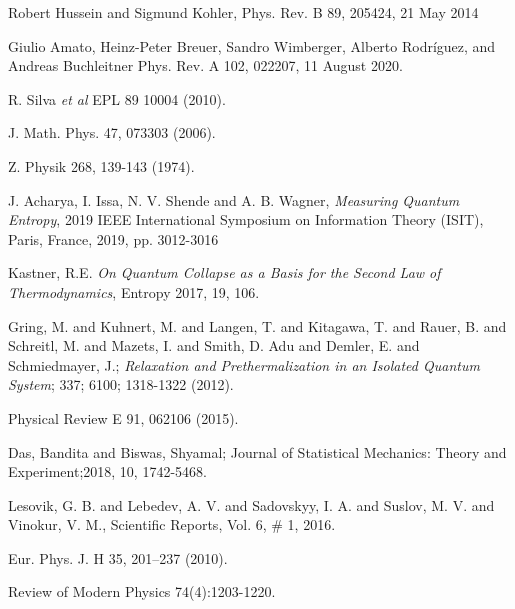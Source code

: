 \documentclass{article}
\begin{document}
\begin{thebibliography}{}
Robert Hussein and Sigmund Kohler,
Phys. Rev. B 89, 205424, 21 May 2014

Giulio Amato, Heinz-Peter Breuer, Sandro Wimberger, Alberto Rodríguez, and Andreas Buchleitner
Phys. Rev. A 102, 022207, 11 August 2020.

R. Silva {\it et al} EPL 89 10004 (2010).

J. Math. Phys. 47, 073303 (2006).

Z. Physik 268, 139-143 (1974).

J. Acharya, I. Issa, N. V. Shende and A. B. Wagner, {\it Measuring Quantum Entropy}, 2019 IEEE International Symposium on Information Theory (ISIT), Paris, France, 2019, pp. 3012-3016

Kastner, R.E. {\it On Quantum Collapse as a Basis for the Second Law of Thermodynamics}, Entropy 2017, 19, 106.



Gring, M. and Kuhnert, M. and Langen, T. and Kitagawa, T. and Rauer, B. and Schreitl, M. and Mazets, I. and Smith, D. Adu and Demler, E. and Schmiedmayer, J.; {\it Relaxation and Prethermalization in an Isolated Quantum System}; 337; 6100; 1318-1322 (2012).

Physical Review E 91, 062106 (2015).




Das, Bandita and Biswas, Shyamal; Journal of Statistical Mechanics: Theory and Experiment;2018, 10, 1742-5468. 

Lesovik, G. B. and Lebedev, A. V. and Sadovskyy, I. A. and Suslov, M. V. and Vinokur, V. M., Scientific Reports, Vol. 6, \# 1, 2016.

Eur. Phys. J. H 35, 201–237 (2010).

Review of Modern Physics 74(4):1203-1220.




\end{thebibliography}{}
\end{document}
